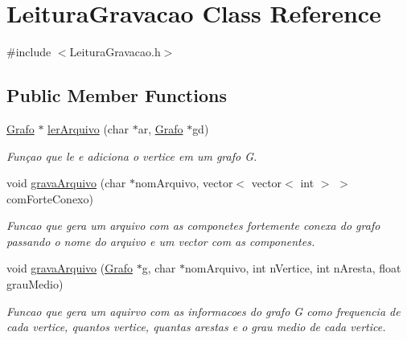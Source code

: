 \hypertarget{class_leitura_gravacao}{\section{Leitura\-Gravacao Class Reference}
\label{class_leitura_gravacao}
}


{\ttfamily \#include $<$Leitura\-Gravacao.\-h$>$}

\subsection*{Public Member Functions}
\begin{DoxyCompactItemize}
\item 
\hyperlink{class_grafo}{Grafo} $\ast$ \hyperlink{class_leitura_gravacao_ae8d26b77bde160493638bc5ab63e08ab}{ler\-Arquivo} (char $\ast$ar, \hyperlink{class_grafo}{Grafo} $\ast$gd)
\begin{DoxyCompactList}\small\item\em Funçao que le e adiciona o vertice em um grafo G. \end{DoxyCompactList}\item 
void \hyperlink{class_leitura_gravacao_a48039a206ba69bd10ee8ac517e586ac9}{grava\-Arquivo} (char $\ast$nom\-Arquivo, vector$<$ vector$<$ int $>$ $>$com\-Forte\-Conexo)
\begin{DoxyCompactList}\small\item\em Funcao que gera um arquivo com as componetes fortemente conexa do grafo passando o nome do arquivo e um vector com as componentes. \end{DoxyCompactList}\item 
void \hyperlink{class_leitura_gravacao_a0285f216b47406414526bd9ddba4aa4f}{grava\-Arquivo} (\hyperlink{class_grafo}{Grafo} $\ast$g, char $\ast$nom\-Arquivo, int n\-Vertice, int n\-Aresta, float grau\-Medio)
\begin{DoxyCompactList}\small\item\em Funcao que gera um aquirvo com as informacoes do grafo G como frequencia de cada vertice, quantos vertice, quantas arestas e o grau medio de cada vertice. \end{DoxyCompactList}\end{DoxyCompactItemize}


